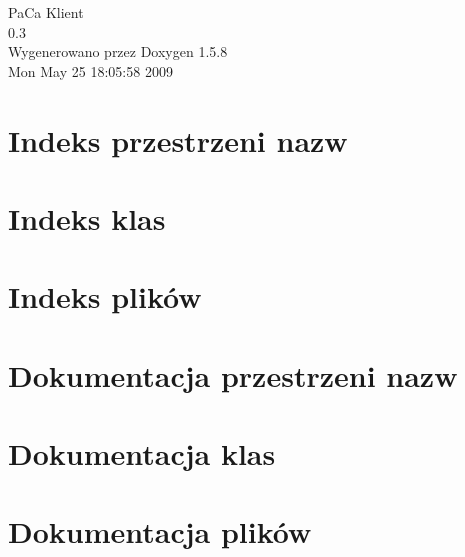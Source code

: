 \documentclass[a4paper]{book}
\begin{document}
\begin{titlepage}
\vspace*{7cm}
\begin{center}
{\Large PaCa Klient \\[1ex]\large 0.3 }\\
\vspace*{1cm}
{\large Wygenerowano przez Doxygen 1.5.8}\\
\vspace*{0.5cm}
{\small Mon May 25 18:05:58 2009}\\
\end{center}
\end{titlepage}
\clearemptydoublepage
{}
\tableofcontents
\clearemptydoublepage
{}
\chapter{Indeks przestrzeni nazw}

\chapter{Indeks klas}

\chapter{Indeks plików}

\chapter{Dokumentacja przestrzeni nazw}

\chapter{Dokumentacja klas}


\chapter{Dokumentacja plików}









\printindex
\end{document}

